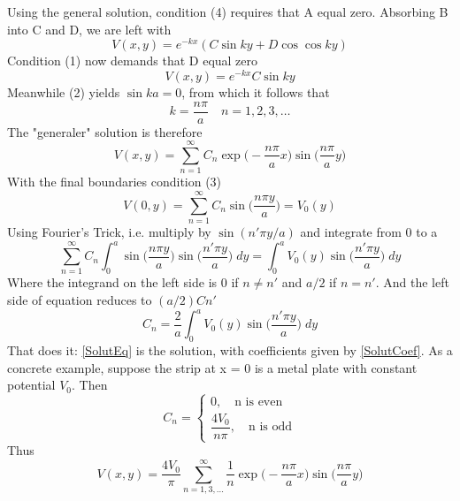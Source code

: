 \documentclass[../../../main.tex]{subfiles}
\begin{document}
Using the general solution, condition (4) requires that A equal zero. Absorbing B into C and D, we are left with
\begin{equation*}
    V(x,y)=e^{-kx}(C\sin ky+D\cos \cos ky)
\end{equation*}
Condition (1) now demands that D equal zero
\begin{equation*}
    V(x,y)=e^{-kx}C\sin ky
\end{equation*}
Meanwhile (2) yields $\sin ka = 0$, from which it follows that
\begin{equation*}
    k=\frac{n\pi}{a}\quad n=1,2,3,\ldots
\end{equation*}
The "generaler" solution is therefore
\begin{equation}\label{SolutEq}
    V(x,y)=\sum_{n=1}^{\infty}C_n\exp\bigg(-\frac{n\pi }{a}x\bigg)\sin \bigg(\frac{n\pi }{a}y\bigg)
\end{equation}
With the final boundaries condition (3)
\begin{equation*}
    V(0,y)=\sum_{n=1}^{\infty}C_n\sin \bigg(\frac{n\pi y}{a}\bigg)=V_0(y)
\end{equation*}
Using Fourier's Trick, i.e. multiply  by $\sin(n'\pi y/a)$ and integrate from 0 to a
\begin{equation*}
    \sum_{n=1}^{\infty}C_n\int_{0}^{a}\sin \bigg(\frac{n\pi y}{a}\bigg) \sin \bigg(\frac{n'\pi y}{a}\bigg)\;dy= \int_{0}^{a}V_0(y)\sin \bigg(\frac{n'\pi y}{a}\bigg)\;dy
\end{equation*}
Where the integrand on the left side is 0 if $n\neq n'$ and $a/2$ if $n= n'$. And the left side of equation reduces to $ (a/2)C n'$
\begin{equation}\label{SolutCoef}
    C_n=\frac{2}{a} \int_{0}^{a}V_0(y)\sin \bigg(\frac{n'\pi y}{a}\bigg)\;dy
\end{equation}
That does it: \ref*{SolutEq} is the solution, with coefficients given by \ref*{SolutCoef}. As a concrete example, suppose the strip at x = 0 is a metal plate with constant potential $V_0$. Then
\begin{equation*}
    C_n=\begin{cases}
        0,\quad \text{n is even}\\
        \dfrac{4V_0}{n\pi}, \quad \text{n is odd}
    \end{cases}
\end{equation*}
Thus
\begin{equation*}
    V(x,y)=\frac{4V_0}{\pi}\sum_{n=1,3,\dots}^{\infty}\frac{1}{n}\exp\bigg(-\frac{n\pi }{a}x\bigg)\sin \bigg(\frac{n\pi }{a}y\bigg)
\end{equation*}
\end{document}

